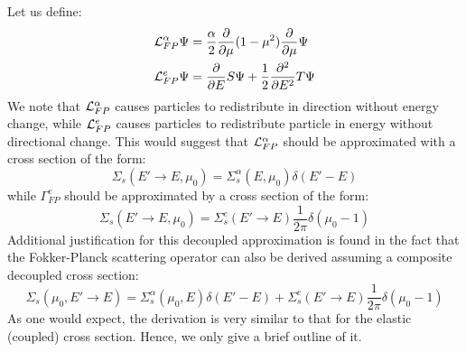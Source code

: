 Let us define:
\begin{align}
\mc{L}_{FP}^{\alpha} \Psi &= \frac{\alpha}{2} \frac{\partial}{\partial \mu}
(1-\mu^2) \frac{\partial}{\partial \mu}\Psi \label{gamma_alpha}\\
\mc{L}_{FP}^e\Psi &=\frac{\partial}{\partial E}S\Psi +
\frac{1}{2}\frac{\partial^2}{\partial E^2} T \Psi \label{gamma_e}
\end{align}
We note that $\mathcal{L}_{FP}^{\alpha}$ causes particles to redistribute in
direction without energy change, while $\mathcal{L}_ {FP}^e$ causes particles to
redistribute particle in energy without directional change. This would suggest
that $\mathcal{L}_{FP}^{\alpha}$ should be approximated with a cross section of the
form:
\begin{equation}
\Sigma_s(E'\rightarrow E,\mu_0) = \Sigma_s^{\alpha}(E,\mu_0) \delta(E'-E)
\end{equation}
while $\Gamma_{FP}^e$ should be approximated by a cross section of the form:
\begin{equation}
\Sigma_s(E'\rightarrow E,\mu_0) = \Sigma_s^e(E'\rightarrow E) \frac{1}{2\pi}
\delta(\mu_0-1)
\end{equation}
Additional justification for this decoupled approximation is found in the fact
that the Fokker-Planck scattering operator
can also be derived assuming a composite decoupled cross section:
\begin{equation}
\Sigma_s(\mu_0,E'\rightarrow E) = \Sigma_s^{\alpha}(\mu_0,E) \delta(E'-E) 
+\Sigma_s^e(E'\rightarrow E) \frac{1}{2\pi} \delta(\mu_0-1)
\end{equation}
As one would expect, the derivation is very similar to that for the elastic
(coupled) cross section. Hence, we only give a brief outline of it.

